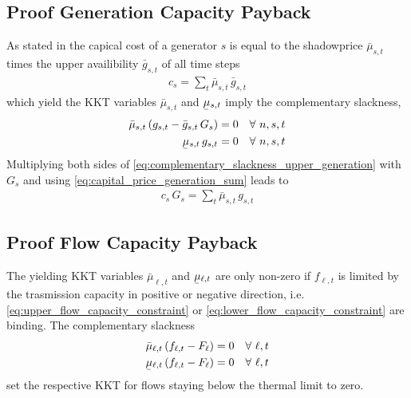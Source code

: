 \documentclass[11pt,twocolumn]{article}
\newcommand{\ubar}[1]{\underaccent{\bar}{#1}}
\newcommand{\Forall}[1]{\hspace{10pt} \forall \,\, #1 }
\newcommand{\generation}{g_{s,t}}
\newcommand{\generationpotential}{\bar{g}_{s,t}}
\newcommand{\capacityGeneration}{G_{s}}
\newcommand{\capacityFlow}{F_{\ell}}
\newcommand{\capexGeneration}{c_{s}}
\newcommand{\mulowergeneration}{\ubar{\mu}_{s,t}}
\newcommand{\muuppergeneration}{\bar{\mu}_{s,t}}
\newcommand{\mulowerflow}{\ubar{\mu}_{\ell,t}}
\newcommand{\muupperflow}{\bar{\mu}_{\ell,t}}
\newcommand{\flow}{f_{\ell,t}}
\begin{document}
\subsection{Proof Generation Capacity Payback}

As stated in \cite{brown_decreasing_2020} the capical cost of a generator $s$ is equal to the shadowprice $\muuppergeneration$ times the upper availibility $\generationpotential$ of all time steps 
\begin{align}
 \capexGeneration  = \sum_t \muuppergeneration \, \generationpotential 
 \label{eq:capital_price_generation_sum}
\end{align}
 which yield the KKT variables $\muuppergeneration$ and $\mulowergeneration$ imply the complementary slackness,
\begin{align}
\muuppergeneration \left( \generation - \generationpotential \, \capacityGeneration \right)  &= 0  \Forall{n,s,t} 
\label{eq:complementary_slackness_upper_generation} \\
\mulowergeneration  \, \generation &= 0 \Forall{n,s,t}
\label{eq:complementary_slackness_lower_generation} 
\end{align}
Multiplying both sides of \cref{eq:complementary_slackness_upper_generation} with $\capacityGeneration$ and using \cref{eq:capital_price_generation_sum} leads to 
\begin{align}
 \capexGeneration \, \capacityGeneration  = \sum_t \muuppergeneration \, \generation 
 \label{eq:capital_price_generation_sum}
\end{align}

\subsection{Proof Flow Capacity Payback}

The yielding KKT variables $\muupperflow$ and $\mulowerflow$ are only non-zero if $\flow$ is limited by the trasmission capacity in positive or negative direction, i.e. \cref{eq:upper_flow_capacity_constraint} or \cref{eq:lower_flow_capacity_constraint} are binding. The complementary slackness 
\begin{align}
\muupperflow \left( \flow - \capacityFlow \right)  &= 0 \Forall{\ell,t}
\label{eq:complementary_slackness_upper_flow} \\
\mulowerflow \left( \flow - \capacityFlow \right) &=  0 \Forall{\ell,t}
\label{eq:complementary_slackness_lower_flow} 
\end{align}
set the respective KKT for flows staying below the thermal limit to zero. 
\end{document}
